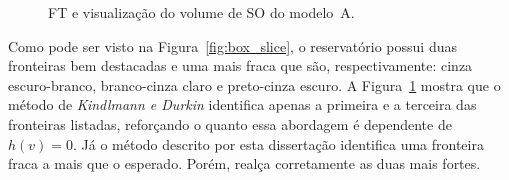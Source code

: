 \begin{figure}[h]
	\centering
	\caption{FT e visualização do volume de SO do modelo~A.}
	\label{fig:r_vrep}
\end{figure}

	Como pode ser visto na Figura~\ref{fig:box_slice}, o reservatório possui duas fronteiras bem destacadas e uma mais fraca que são, respectivamente: cinza escuro-branco, branco-cinza claro e preto-cinza escuro. A Figura~\ref{fig:r_vrep} mostra que o método de \textit{Kindlmann e Durkin} identifica apenas a primeira e a terceira das fronteiras listadas, reforçando o quanto essa abordagem é dependente de $ h(v) = 0 $. Já o método descrito por esta dissertação identifica uma fronteira fraca a mais que o esperado. Porém, realça corretamente as duas mais fortes.

